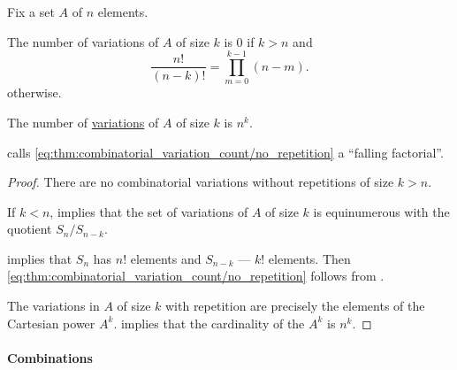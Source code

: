 \begin{proposition}\label{thm:combinatorial_variation_count}
  Fix a set \( A \) of \( n \) elements.

  \begin{thmenum}
     The number of variations of \( A \) of size \( k \)  is \( 0 \) if \( k > n \) and
    \begin{equation}\label{eq:thm:combinatorial_variation_count/no_repetition}
      \frac {n!} {(n - k)!} = \prod_{m=0}^{k - 1} (n - m).
    \end{equation}
    otherwise.

     The number of \hyperref[def:combinatorial_variation]{variations} of \( A \) of size \( k \)  is \( n^k \).
  \end{thmenum}
\end{proposition}
\begin{comments}
  \item {} calls \eqref{eq:thm:combinatorial_variation_count/no_repetition} a \enquote{falling factorial}.
\end{comments}
\begin{proof}
   There are no combinatorial variations without repetitions of size \( k > n \).

  If \( k < n \),  implies that the set of variations of \( A \) of size \( k \) is equinumerous with the quotient \( S_n / S_{n - k} \).

   implies that \( S_n \) has \( n! \) elements and \( S_{n - k} \) --- \( k! \) elements. Then \eqref{eq:thm:combinatorial_variation_count/no_repetition} follows from .

   The variations in \( A \) of size \( k \) with repetition are precisely the elements of the Cartesian power \( A^k \).  implies that the cardinality of the \( A^k \) is \( n^k \).
\end{proof}

\paragraph{Combinations}

